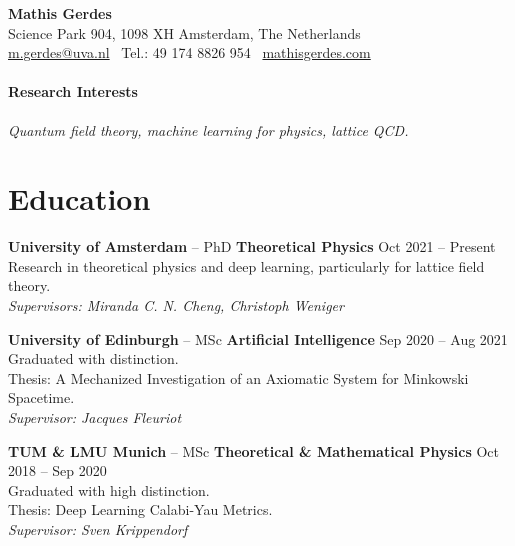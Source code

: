 \documentclass[11pt, letterpaper]{article}
\newcommand{\dateright}[1]{\hfill{\small\color{accentblue} #1}}
\begin{document}
\begin{center}
    {\LARGE \textbf{Mathis Gerdes}} \\
    \vspace{0.15cm}
    Science Park 904, 1098 XH Amsterdam, The Netherlands \\
    \href{mailto:m.gerdes@uva.nl}{m.gerdes@uva.nl} \textbullet\
    Tel.: \raisebox{0.2\height}{\footnotesize +}49 174 8826 954 \textbullet\
    \href{http://www.mathisgerdes.com}{mathisgerdes.com}
\end{center}

\vspace{0.4cm}

\paragraph{Research Interests}
\textit{Quantum field theory, machine learning for physics, lattice QCD.}

\section*{Education}
\noindent
\textbf{University of Amsterdam} -- PhD \textbf{Theoretical Physics} \dateright{Oct 2021 -- Present} \\
Research in theoretical physics and deep learning, particularly for lattice field theory. \\
\textit{Supervisors: Miranda C. N. Cheng, Christoph Weniger}

\vspace{0.2cm}

\noindent
\textbf{University of Edinburgh} -- MSc \textbf{Artificial Intelligence} \dateright{Sep 2020 -- Aug 2021} \\
Graduated with distinction. \\
Thesis: A Mechanized Investigation of an Axiomatic System for Minkowski Spacetime. \\
\textit{Supervisor: Jacques Fleuriot}

\vspace{0.2cm}

\noindent
\textbf{TUM \& LMU Munich} -- MSc \textbf{Theoretical \& Mathematical Physics} \dateright{Oct 2018 -- Sep 2020} \\
Graduated with high distinction. \\
Thesis: Deep Learning Calabi-Yau Metrics. \\
\textit{Supervisor: Sven Krippendorf}
\end{document}
